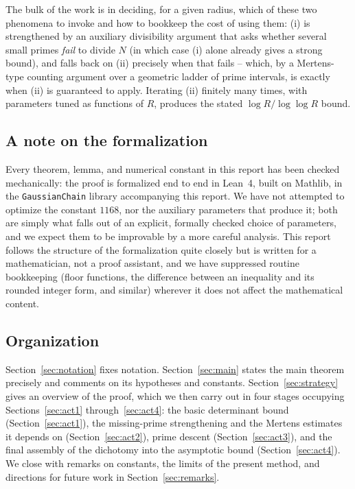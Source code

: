\documentclass[11pt]{amsart}
\theoremstyle{definition}
\theoremstyle{remark}
\begin{document}
The bulk of the work is in deciding, for a given radius, which of these two phenomena to invoke and how to bookkeep the cost of using them: (i) is strengthened by an auxiliary divisibility argument that asks whether several small primes \emph{fail} to divide $N$ (in which case (i) alone already gives a strong bound), and falls back on (ii) precisely when that fails -- which, by a Mertens-type counting argument over a geometric ladder of prime intervals, is exactly when (ii) is guaranteed to apply. Iterating (ii) finitely many times, with parameters tuned as functions of $R$, produces the stated $\log R/\log\log R$ bound.

\subsection*{A note on the formalization} Every theorem, lemma, and numerical constant in this report has been checked mechanically: the proof is formalized end to end in Lean~4, built on Mathlib, in the \texttt{GaussianChain} library accompanying this report. We have not attempted to optimize the constant $1168$, nor the auxiliary parameters that produce it; both are simply what falls out of an explicit, formally checked choice of parameters, and we expect them to be improvable by a more careful analysis. This report follows the structure of the formalization quite closely but is written for a mathematician, not a proof assistant, and we have suppressed routine bookkeeping (floor functions, the difference between an inequality and its rounded integer form, and similar) wherever it does not affect the mathematical content.

\subsection*{Organization} Section~\ref{sec:notation} fixes notation. Section~\ref{sec:main} states the main theorem precisely and comments on its hypotheses and constants. Section~\ref{sec:strategy} gives an overview of the proof, which we then carry out in four stages occupying Sections~\ref{sec:act1} through~\ref{sec:act4}: the basic determinant bound (Section~\ref{sec:act1}), the missing-prime strengthening and the Mertens estimates it depends on (Section~\ref{sec:act2}), prime descent (Section~\ref{sec:act3}), and the final assembly of the dichotomy into the asymptotic bound (Section~\ref{sec:act4}). We close with remarks on constants, the limits of the present method, and directions for future work in Section~\ref{sec:remarks}.
\end{document}
